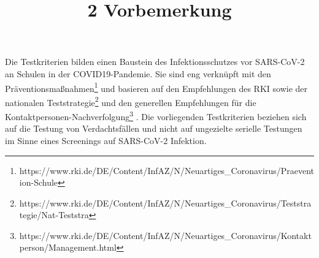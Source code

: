 \documentclass{article}
\begin{document}
\title{2 Vorbemerkung}

\maketitle


Die Testkriterien bilden einen Baustein des Infektionsschutzes vor SARS-CoV-2 an Schulen in der COVID19-Pandemie. Sie sind eng verknüpft mit den Präventionsmaßnahmen\footnote{https://www.rki.de/DE/Content/InfAZ/N/Neuartiges\_Coronavirus/Praevention-Schule} und basieren auf den Empfehlungen des RKI sowie der nationalen Teststrategie\footnote{https://www.rki.de/DE/Content/InfAZ/N/Neuartiges\_Coronavirus/Teststrategie/Nat-Teststra} und den generellen Empfehlungen für die Kontaktpersonen-Nachverfolgung\footnote{https://www.rki.de/DE/Content/InfAZ/N/Neuartiges\_Coronavirus/Kontaktperson/Management.html} . Die vorliegenden Testkriterien beziehen sich auf die Testung von Verdachtsfällen und nicht auf ungezielte serielle Testungen im Sinne eines Screenings auf SARS-CoV-2 Infektion.
\end{document}
